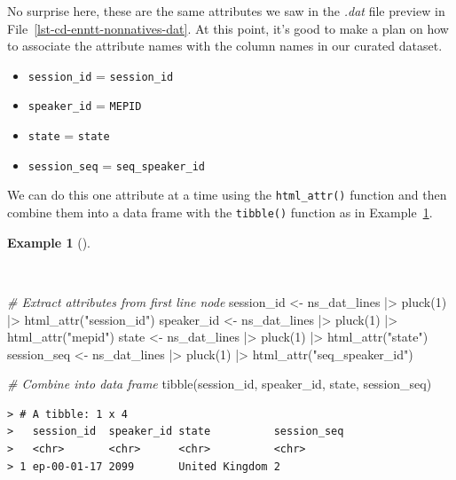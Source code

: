\documentclass[
  letterpaper,
]{latex/krantz}
\newenvironment{Shaded}{\begin{snugshade}}{\end{snugshade}}
\newcommand{\CommentTok}[1]{\textcolor[rgb]{0.00,0.00,0.00}{\textit{#1}}}
\newcommand{\DecValTok}[1]{\textcolor[rgb]{0.00,0.00,0.00}{#1}}
\newcommand{\FunctionTok}[1]{\textcolor[rgb]{0.00,0.00,0.00}{#1}}
\newcommand{\NormalTok}[1]{\textcolor[rgb]{0.00,0.00,0.00}{#1}}
\newcommand{\OtherTok}[1]{\textcolor[rgb]{0.00,0.00,0.00}{#1}}
\newcommand{\SpecialCharTok}[1]{\textcolor[rgb]{0.00,0.00,0.00}{#1}}
\newcommand{\StringTok}[1]{\textcolor[rgb]{0.00,0.00,0.00}{#1}}
\providecommand{\tightlist}{%
  \setlength{\itemsep}{0pt}\setlength{\parskip}{0pt}}\usepackage{longtable,booktabs,array}
\theoremstyle{definition}
\newtheorem{example}{Example}[chapter]
\theoremstyle{remark}
\begin{document}
No surprise here, these are the same attributes we saw in the
\emph{.dat} file preview in File~\ref{lst-cd-enntt-nonnatives-dat}. At
this point, it's good to make a plan on how to associate the attribute
names with the column names in our curated dataset.

\begin{itemize}
\tightlist
\item
  \texttt{session\_id} = \texttt{session\_id}
\item
  \texttt{speaker\_id} = \texttt{MEPID}
\item
  \texttt{state} = \texttt{state}
\item
  \texttt{session\_seq} = \texttt{seq\_speaker\_id}
\end{itemize}

We can do this one attribute at a time using the \texttt{html\_attr()}
function and then combine them into a data frame with the
\texttt{tibble()} function as in
Example~\ref{exm-cd-enntt-extract-attributes}.

\begin{example}[]\protect\hypertarget{exm-cd-enntt-extract-attributes}{}\label{exm-cd-enntt-extract-attributes}

~

\begin{Shaded}
\begin{Highlighting}[]
\CommentTok{\# Extract attributes from first line node}
\NormalTok{session\_id }\OtherTok{\textless{}{-}}\NormalTok{ ns\_dat\_lines }\SpecialCharTok{|\textgreater{}} \FunctionTok{pluck}\NormalTok{(}\DecValTok{1}\NormalTok{) }\SpecialCharTok{|\textgreater{}} \FunctionTok{html\_attr}\NormalTok{(}\StringTok{"session\_id"}\NormalTok{)}
\NormalTok{speaker\_id }\OtherTok{\textless{}{-}}\NormalTok{ ns\_dat\_lines }\SpecialCharTok{|\textgreater{}} \FunctionTok{pluck}\NormalTok{(}\DecValTok{1}\NormalTok{) }\SpecialCharTok{|\textgreater{}} \FunctionTok{html\_attr}\NormalTok{(}\StringTok{"mepid"}\NormalTok{)}
\NormalTok{state }\OtherTok{\textless{}{-}}\NormalTok{ ns\_dat\_lines }\SpecialCharTok{|\textgreater{}} \FunctionTok{pluck}\NormalTok{(}\DecValTok{1}\NormalTok{) }\SpecialCharTok{|\textgreater{}} \FunctionTok{html\_attr}\NormalTok{(}\StringTok{"state"}\NormalTok{)}
\NormalTok{session\_seq }\OtherTok{\textless{}{-}}\NormalTok{ ns\_dat\_lines }\SpecialCharTok{|\textgreater{}} \FunctionTok{pluck}\NormalTok{(}\DecValTok{1}\NormalTok{) }\SpecialCharTok{|\textgreater{}} \FunctionTok{html\_attr}\NormalTok{(}\StringTok{"seq\_speaker\_id"}\NormalTok{)}

\CommentTok{\# Combine into data frame}
\FunctionTok{tibble}\NormalTok{(session\_id, speaker\_id, state, session\_seq)}
\end{Highlighting}
\end{Shaded}

\begin{verbatim}
> # A tibble: 1 x 4
>   session_id  speaker_id state          session_seq
>   <chr>       <chr>      <chr>          <chr>      
> 1 ep-00-01-17 2099       United Kingdom 2
\end{verbatim}

\end{example}
\end{document}
